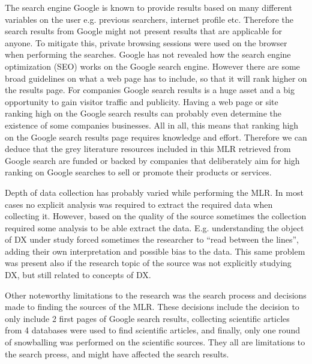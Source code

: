 \documentclass[english, 12pt, a4paper, sci, utf8, a-1b, online]{aaltothesis}
\begin{document}
The search engine Google is known to provide results based on many different variables on the user e.g. previous searchers, internet profile etc. Therefore the search results from Google might not present results that are applicable for anyone. To mitigate this, private browsing sessions were used on the browser when performing the searches. Google has not revealed how the search engine optimization (SEO) works on the Google search engine. However there are some broad guidelines on what a web page has to include, so that it will rank higher on the results page. For companies Google search results is a huge asset and a big opportunity to gain visitor traffic and publicity. Having a web page or site ranking high on the Google search results can probably even determine the existence of some companies businesses. All in all, this means that ranking high on the Google search results page requires knowledge and effort. Therefore we can deduce that the grey literature resources included in this MLR retrieved from Google search are funded or backed by companies that deliberately aim for high ranking on Google searches to sell or promote their products or services.

Depth of data collection has probably varied while performing the MLR. In most cases no explicit analysis was required to extract the required data when collecting it. However, based on the quality of the source sometimes the collection required some analysis to be able extract the data. E.g. understanding the object of DX under study forced sometimes the researcher to ``read between the lines'', adding their own interpretation and possible bias to the data. This same problem was present also if the research topic of the source was not explicitly  studying DX, but still related to concepts of DX.

Other noteworthy limitations to the research was the search process and decisions made to finding the sources of the MLR. These decisions include the decision to only include 2 first pages of Google search results, collecting scientific articles from 4 databases were used to find scientific articles, and finally, only one round of snowballing was performed on the scientific sources. They all are limitations to the search prcess, and might have affected the search results.


\end{document}
